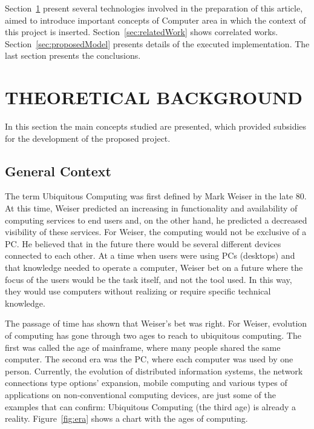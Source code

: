 \documentclass{acm_proc_article-sp}
\begin{document}
Section~\ref{sec:theoreticalBackground} present several technologies involved in the preparation of this article, aimed to introduce important concepts of Computer area in which the context of this project is inserted. Section~\ref{sec:relatedWork} shows correlated works. Section~\ref{sec:proposedModel} presents details of the executed implementation. The last section presents the conclusions.




\section{THEORETICAL BACKGROUND}
\label{sec:theoreticalBackground}
In this section the main concepts studied are presented, which provided subsidies for the development of the proposed project.

\subsection{General Context}
The term Ubiquitous Computing was first defined by Mark Weiser \cite{weiser1991} in the late 80. At this time, Weiser predicted an increasing in functionality and availability of computing services to end users and, on the other hand, he predicted a decreased visibility of these services. For Weiser, the computing would not be exclusive of a PC. He believed that in the future there would be several different devices connected to each other. At a time when users were using PCs (desktops) and that knowledge needed to operate a computer,  Weiser bet on a future where the focus of the users would be the task itself, and not the tool used. In this way, they would use computers without realizing or require specific technical knowledge. \cite{weiser1994world}
\newline
\newline

The passage of time has shown that Weiser's bet was right. For Weiser, \cite{weiser1997coming} evolution of computing has gone through two ages to reach to ubiquitous computing. The first was called the age of mainframe, where many people shared the same computer. The second era was the PC, where each computer was used by one person. Currently, the evolution of distributed information systems, the network connections type options'  expansion, mobile computing and various types of applications on non-conventional computing devices, are just some of the examples that can confirm: Ubiquitous Computing (the third age) is already a reality. Figure~\ref{fig:era} shows a chart with the ages of computing.
\newline
\newline
\end{document}
